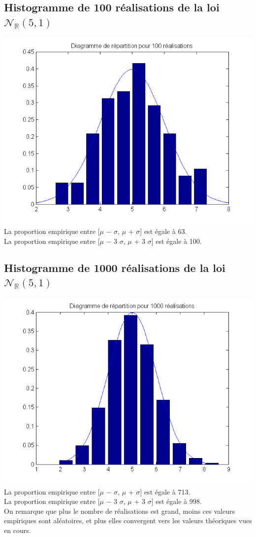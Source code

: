 \documentclass{report}
\begin{document}
		\subsection{Histogramme de 100 réalisations de la loi $\mathcal{N}_{\mathbb{R}}(5, 1)$}
			\includegraphics[scale=0.7]{sources/Q212-1.png} \\
			La proportion empirique entre [$\mu$ − $\sigma$, $\mu$ + $\sigma$] est égale à 63. \\
			La proportion empirique entre [$\mu$ − 3 $\sigma$, $\mu$ + 3 $\sigma$] est égale à 100. \\
		\subsection{Histogramme de 1000 réalisations de la loi $\mathcal{N}_{\mathbb{R}}(5, 1)$}
			\includegraphics[scale=0.7]{sources/Q212-2.png} \\
			La proportion empirique entre [$\mu$ − $\sigma$, $\mu$ + $\sigma$] est égale à 713. \\
			La proportion empirique entre [$\mu$ − 3 $\sigma$, $\mu$ + 3 $\sigma$] est égale à 998. \\
			On remarque que plus le nombre de réalisations est grand, moins ces valeurs empiriques sont aléatoires, et plus elles convergent vers les valeurs théoriques vues en cours. \\
\end{document}
